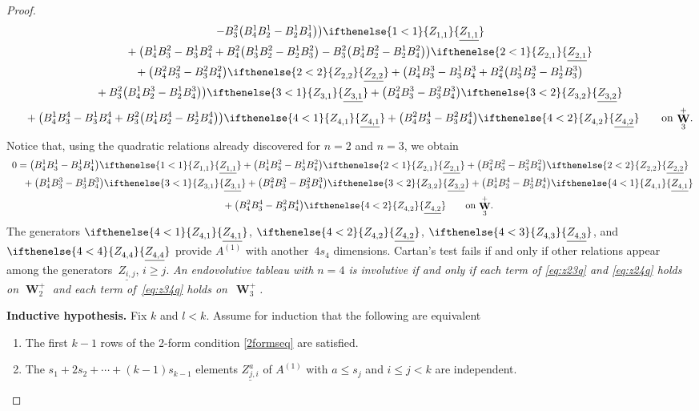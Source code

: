 \documentclass[pdftex]{sigma}
\numberwithin{equation}{section}
\DeclareMathOperator{\Wu}{\mathbf{W}}
\newcommand{\Z}[3]{\ifthenelse{#1<#2}{\ensuremath{Z^{#3}_{#1,#2}}}{\ensuremath{\underline{Z^{#3}_{#1,#2}}}}}
\begin{document}
\begin{proof}
\begin{gather*}
- B^{2}_{3}\big( B^{1}_{4}B^{1}_{2} - B^{1}_{2}B^{1}_{4}\big) \big)
\Z{1}{1}{}\\
 \phantom{0=}{}
+ \big( B^{1}_{4}B^{2}_{3} - B^{1}_{3}B^{2}_{4}
+ B^{2}_{4}\big(B^{1}_{3}B^{2}_{2} - B^{1}_{2}B^{2}_{3}\big)
- B^{2}_{3}\big(B^{1}_{4}B^{2}_{2} - B^{1}_{2}B^{2}_{4}\big)\big)
\Z{2}{1}{}\\
 \phantom{0=}{}
+ \big( B^{2}_{4}B^{2}_{3} - B^{2}_{3}B^{2}_{4}\big)\Z{2}{2}{}
+
\big( B^{1}_{4}B^{3}_{3} - B^{1}_{3}B^{3}_{4}
+ B^{2}_{4}\big( B^{1}_{3}B^{3}_{2} - B^{1}_{2}B^{3}_{3}\big)\\
 \phantom{0=}{}
+ B^{2}_{3}\big( B^{1}_{4}B^{3}_{2} - B^{1}_{2}B^{3}_{4}\big)
\big)\Z{3}{1}{}
+ \big(B^{2}_{4}B^{3}_{3} - B^{2}_{3}B^{3}_{4}\big)\Z{3}{2}{}  \\
 \phantom{0=}{}
+
\big(B^{1}_{4}B^{4}_{3} - B^{1}_{3}B^{4}_{4} + B^{2}_{3}
\big( B^{1}_{4}B^{4}_{2} - B^{1}_{2}B^{4}_{4}\big) \big)\Z{4}{1}{}
+
\big(B^{2}_{4}B^{4}_{3} - B^{2}_{3}B^{4}_{4}\big)\Z{4}{2}{} \qquad \text{on
$\Wu^+_3$}.
\end{gather*}
Notice that, using the quadratic relations already discovered for $n=2$ and
$n=3$, we obtain
\begin{gather}
0=
  \big(B^{1}_{4}B^{1}_{3} - B^{1}_{3}B^{1}_{4}\big)\Z{1}{1}{}
+ \big(B^{1}_{4}B^{2}_{3} - B^{1}_{3}B^{2}_{4}\big)\Z{2}{1}{}
+ \big(B^{2}_{4}B^{2}_{3} - B^{2}_{3}B^{2}_{4}\big)\Z{2}{2}{}
\nonumber\\
\phantom{0=}{}
+ \big(B^{1}_{4}B^{3}_{3} - B^{1}_{3}B^{3}_{4}\big)\Z{3}{1}{}+ \big(B^{2}_{4}B^{3}_{3} - B^{2}_{3}B^{3}_{4}\big)\Z{3}{2}{}
+ \big(B^{1}_{4}B^{4}_{3} - B^{1}_{3}B^{4}_{4}\big)\Z{4}{1}{} \nonumber\\
\phantom{0=}{}
+ \big(B^{2}_{4}B^{4}_{3} - B^{2}_{3}B^{4}_{4}\big)\Z{4}{2}{} \qquad \text{on
$\Wu^+_3$}.
\label{eq:z34q}
\end{gather}
The generators $\Z{4}{1}{}$, $\Z{4}{2}{}$, $\Z{4}{3}{}$, and $\Z{4}{4}{}$ provide
$A^{(1)}$ with another~$4s_4$ dimensions.
Cartan's test fails if and
only if other relations appear among the generators~$\underline{Z_{i,j}}$, $i
\geq j$.
 \emph{An endovolutive tableau with $n=4$ is involutive if and only if
each term of \eqref{eq:z23q} and \eqref{eq:z24q} holds on $\Wu^+_2$ and each term of~\eqref{eq:z34q} holds on~$\Wu^+_3$.}

\textbf{Inductive hypothesis.}
Fix $k$ and $l<k$.
Assume for induction that the following are equivalent
\begin{enumerate}\itemsep=0pt
\item The f\/irst $k-1$ rows of the 2-form condition \eqref{2formseq} are
satisf\/ied.
\item The $s_1 + 2s_2 + \cdots + (k-1)s_{k-1}$ elements $\underline{Z^a_{j,i}}$
of $A^{(1)}$ with $a \leq s_j$ and $i \leq j < k$ are independent.
\end{enumerate}


\end{proof}
\end{document}
